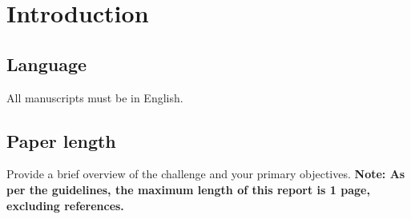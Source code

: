 \section{Introduction}
\label{sec:intro}

\subsection{Language}

All manuscripts must be in English.

\subsection{Paper length}
Provide a brief overview of the challenge and your primary objectives. \textbf{Note: As per the guidelines, the maximum length of this report is 1 page, excluding references.}
